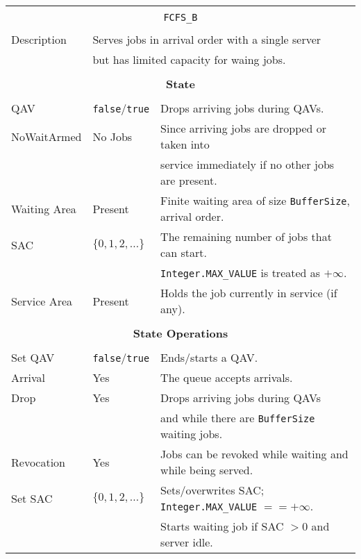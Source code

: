 \documentclass[12pt]{book}
\begin{document}
\begin{tabular}{|l|l|l|}
\hline
\multicolumn{3}{|c|}{} \\
\multicolumn{3}{|c|}{\lstinline[basicstyle=\large]{FCFS_B}} \\
\multicolumn{3}{|c|}{} \\
\hline
Description & \multicolumn{2}{|l|}{Serves jobs in arrival order with a single server} \\
            & \multicolumn{2}{|l|}{but has limited capacity for waing jobs.} \\
\hline
\multicolumn{3}{|c|}{} \\
\multicolumn{3}{|c|}{\bf State} \\
\multicolumn{3}{|c|}{} \\
\hline
QAV & \lstinline|false|/\lstinline|true| & Drops arriving jobs during QAVs. \\
\hline
NoWaitArmed & No Jobs & Since arriving jobs are dropped or taken into \\
            &         & service immediately if no other jobs are present. \\
\hline
Waiting Area & Present & Finite waiting area of size \lstinline|BufferSize|, arrival order. \\
\hline
SAC & $\{0, 1, 2, \ldots\}$ & The remaining number of jobs that can start. \\
    &                       & \lstinline|Integer.MAX_VALUE| is treated as $+\infty$. \\
\hline
Service Area & Present & Holds the job currently in service (if any). \\
\hline
\multicolumn{3}{|c|}{} \\
\multicolumn{3}{|c|}{\bf State Operations} \\
\multicolumn{3}{|c|}{} \\
\hline
Set QAV & \lstinline|false|/\lstinline|true| & Ends/starts a QAV. \\
\hline
Arrival & Yes & The queue accepts arrivals. \\
\hline
Drop & Yes & Drops arriving jobs during QAVs \\
     &     & and while there are \lstinline|BufferSize| waiting jobs. \\
\hline
Revocation & Yes & Jobs can be revoked while waiting and while being served. \\
\hline
Set SAC & $\{0, 1, 2, \ldots\}$ & Sets/overwrites SAC; \lstinline|Integer.MAX_VALUE| $== +\infty$. \\
        &                       & Starts waiting job if SAC $> 0$ and server idle. \\

\end{tabular}
\end{document}
